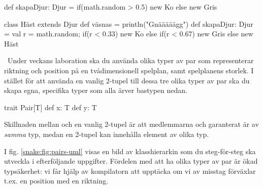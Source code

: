 \SOLUTION


\TaskSolved \what


\SubtaskSolved
\begin{Code}
def skapaDjur: Djur =
   {if(math.random > 0.5) new Ko else new Gris}
\end{Code}

\SubtaskSolved
\begin{Code}
class Häst extends Djur{ def väsnas = println("Gnääääägg") }
def skapaDjur: Djur = {val r = math.random;
   if(r < 0.33) new Ko else if(r < 0.67) new Gris else new Häst}
\end{Code}


\QUESTEND









\QUESTBEGIN


\Task\label{exe:inheritance:labprep-pair}  \what~Under veckans laboration ska du använda olika typer av par som representerar riktning och position på en tvådimensionell spelplan, samt spelplanens storlek. I stället för att använda en vanlig 2-tupel till dessa tre olika typer av par ska du skapa egna, specifika  typer som alla ärver bastypen  nedan.
\begin{Code}
trait Pair[T] {
  def x: T
  def y: T
}
\end{Code}
Skillnaden mellan  och en vanlig 2-tupel är att medlemmarna  och  garanterat är av \emph{samma} typ, medan en 2-tupel kan innehålla element av olika typ.

I fig. \ref{snake:fig:pairs-uml} visas en bild av klasshierarkin som du steg-för-steg ska utveckla i efterföljande  uppgifter. Fördelen med att ha olika typer av par är ökad typsäkerhet: vi får hjälp av kompilatorn att upptäcka om vi av misstag förväxlar t.ex. en position med en riktning.

